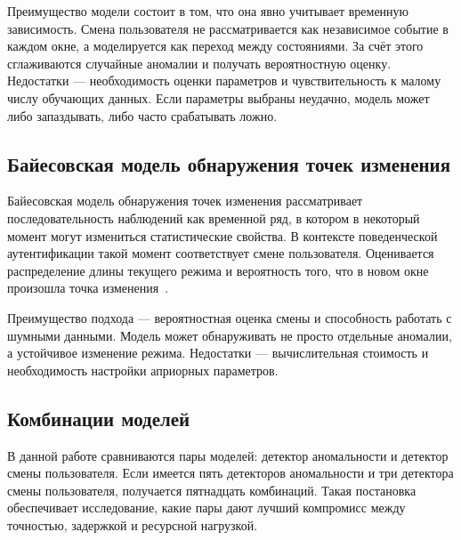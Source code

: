 \documentclass[oneside,senior,etd]{BYUPhys}
\begin{document}
Преимущество модели состоит в том, что она явно учитывает временную зависимость. Смена пользователя не рассматривается как независимое событие в каждом окне, а моделируется как переход между состояниями. За счёт этого сглаживаются случайные аномалии и получать вероятностную оценку. Недостатки --- необходимость оценки параметров и чувствительность к малому числу обучающих данных. Если параметры выбраны неудачно, модель может либо запаздывать, либо часто срабатывать ложно.

\subsection{Байесовская модель обнаружения точек изменения}

Байесовская модель обнаружения точек изменения рассматривает последовательность наблюдений как временной ряд, в котором в некоторый момент могут измениться статистические свойства. В контексте поведенческой аутентификации такой момент соответствует смене пользователя. Оценивается распределение длины текущего режима и вероятность того, что в новом окне произошла точка изменения~\cite{adams2007bocpd,shumway2023time}.

Преимущество подхода --- вероятностная оценка смены и способность работать с шумными данными. Модель может обнаруживать не просто отдельные аномалии, а устойчивое изменение режима. Недостатки --- вычислительная стоимость и необходимость настройки априорных параметров.

\subsection{Комбинации моделей}

В данной работе сравниваются пары моделей: детектор аномальности и детектор смены пользователя. Если имеется пять детекторов аномальности и три детектора смены пользователя, получается пятнадцать комбинаций. Такая постановка обеспечивает исследование, какие пары дают лучший компромисс между точностью, задержкой и ресурсной нагрузкой.
\end{document}
